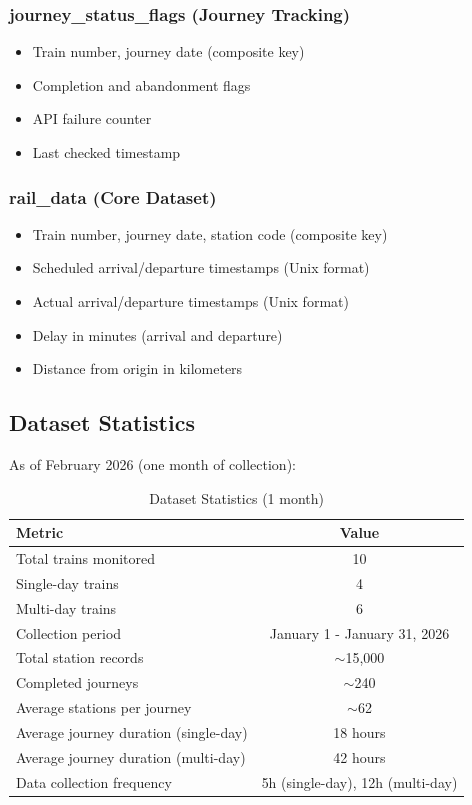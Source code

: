 \documentclass[11pt,a4paper]{article}
\begin{document}
\subsubsection{journey\_status\_flags (Journey Tracking)}
\begin{itemize}
    \item Train number, journey date (composite key)
    \item Completion and abandonment flags
    \item API failure counter
    \item Last checked timestamp
\end{itemize}

\subsubsection{rail\_data (Core Dataset)}
\begin{itemize}
    \item Train number, journey date, station code (composite key)
    \item Scheduled arrival/departure timestamps (Unix format)
    \item Actual arrival/departure timestamps (Unix format)
    \item Delay in minutes (arrival and departure)
    \item Distance from origin in kilometers
\end{itemize}

\subsection{Dataset Statistics}

As of February 2026 (one month of collection):

\begin{table}[h]
\centering
\begin{tabular}{@{}lc@{}}
\toprule
\textbf{Metric} & \textbf{Value} \\
\midrule
Total trains monitored & 10 \\
Single-day trains & 4 \\
Multi-day trains & 6 \\
Collection period & January 1 - January 31, 2026 \\
Total station records & $\sim$15,000 \\
Completed journeys & $\sim$240 \\
Average stations per journey & $\sim$62 \\
Average journey duration (single-day) & 18 hours \\
Average journey duration (multi-day) & 42 hours \\
Data collection frequency & 5h (single-day), 12h (multi-day) \\
\bottomrule
\end{tabular}
\caption{Dataset Statistics (1 month)}
\label{tab:dataset_stats}
\end{table}
\end{document}
